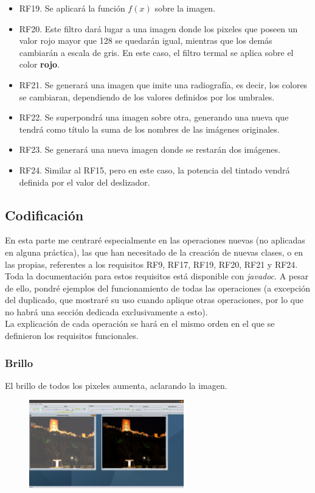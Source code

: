 \documentclass[11pt,a4paper]{article}
\begin{document}
\begin{itemize}
	\item RF19. Se aplicará la función $f(x)$ sobre la imagen.
	\item RF20. Este filtro dará lugar a una imagen donde los pixeles que poseen un valor rojo mayor que 128 se quedarán igual, mientras que los demás cambiarán a escala de gris. En este caso, el filtro termal se aplica sobre el color \textbf{rojo}.
	\item RF21. Se generará una imagen que imite una radiografía, es decir, los colores se cambiaran, dependiendo de los valores definidos por los umbrales.
	\item RF22. Se superpondrá una imagen sobre otra, generando una nueva que tendrá como título la suma de los nombres de las imágenes originales.
	\item RF23. Se generará una nueva imagen donde se restarán dos imágenes.
	\item RF24. Similar al RF15, pero en este caso, la potencia del tintado vendrá definida por el valor del deslizador.
\end{itemize}

\subsection{Codificación}

En esta parte me centraré especialmente en las operaciones nuevas (no aplicadas en alguna práctica), las que han necesitado de la creación de nuevas clases, o en las propias, referentes a los requisitos RF9, RF17, RF19, RF20, RF21 y RF24. Toda la documentación para estos requisitos está disponible con \textit{javadoc}. A pesar de ello, pondré ejemplos del funcionamiento de todas las operaciones (a excepción del duplicado, que mostraré su uso cuando aplique otras operaciones, por lo que no habrá una sección dedicada exclusivamente a esto).\\

La explicación de cada operación se hará en el mismo orden en el que se definieron los requisitos funcionales.

\subsubsection{Brillo}
El brillo de todos los pixeles aumenta, aclarando la imagen.

\begin{figure}[H]
\centering
	\includegraphics[width=0.6\textwidth]{img/brillo.png}
\end{figure}
\end{document}
